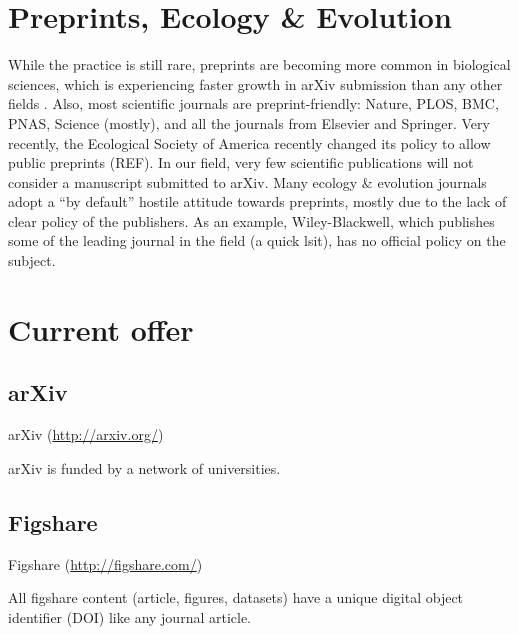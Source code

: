 \documentclass[letterpaper,twocolumn,superscriptaddress,showkeys]{revtex4}
\begin{document}


\section{Preprints, Ecology \& Evolution}

While the practice is still rare, preprints are becoming more common in
biological sciences, which is experiencing faster growth in arXiv submission
than any other fields \cite{cal12}. Also, most scientific journals are
preprint-friendly: Nature, PLOS, BMC, PNAS, Science (mostly), and all the
journals from Elsevier and Springer. Very recently, the Ecological Society of
America recently changed its policy to allow public preprints (REF). In our
field, very few scientific publications will not consider a manuscript
submitted to arXiv. Many ecology \& evolution journals adopt a ``by default''
hostile attitude towards preprints, mostly due to the lack of clear policy of
the publishers. As an example, Wiley-Blackwell, which publishes some of the
leading journal in the field (a quick lsit), has no official policy on the
subject.


\section{Current offer}


\subsection{arXiv}

arXiv (\href{http://arxiv.org/}{http://arxiv.org/})

arXiv is funded by a network of universities.

\subsection{Figshare}

Figshare (\href{http://figshare.com/}{http://figshare.com/})

All figshare content (article, figures, datasets) have a unique digital object
identifier (DOI) like any journal article.
\end{document}

